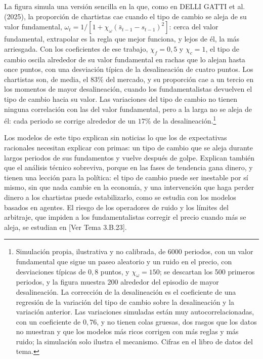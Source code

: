 \documentclass[10pt,a4paper]{article}
\newcommand{\authorfont}[1]{{\fontfamily{EBGaramond-TLF}\selectfont #1}}
\begin{document}
La figura simula una versión sencilla en la que, como en DELLI GATTI et al. (2025), la proporción de chartistas cae cuando el tipo de cambio se aleja de su valor fundamental, $\omega_t=1/[1+\chi_\omega(\bar s_{t-1}-s_{t-1})^2]$: cerca del valor fundamental, extrapolar es la regla que mejor funciona, y lejos de él, la más arriesgada. Con los coeficientes de ese trabajo, $\chi_f=0{,}5$ y $\chi_c=1$, el tipo de cambio oscila alrededor de su valor fundamental en rachas que lo alejan hasta once puntos, con una desviación típica de la desalineación de cuatro puntos. Los chartistas son, de media, el $83\%$ del mercado, y su proporción cae a un tercio en los momentos de mayor desalineación, cuando los fundamentalistas devuelven el tipo de cambio hacia su valor. Las variaciones del tipo de cambio no tienen ninguna correlación con las del valor fundamental, pero a la larga no se aleja de él: cada periodo se corrige alrededor de un $17\%$ de la desalineación.\footnote{%
    Simulación propia, ilustrativa y no calibrada, de 6000 periodos, con un valor fundamental que sigue un paseo aleatorio y un ruido en el precio, con desviaciones típicas de $0{,}8$ puntos, y $\chi_\omega=150$; se descartan los 500 primeros periodos, y la figura muestra 200 alrededor del episodio de mayor desalineación. La corrección de la desalineación es el coeficiente de una regresión de la variación del tipo de cambio sobre la desalineación y la variación anterior. Las variaciones simuladas están muy autocorrelacionadas, con un coeficiente de $0{,}76$, y no tienen colas gruesas, dos rasgos que los datos no muestran y que los modelos más ricos corrigen con más reglas y más ruido; la simulación solo ilustra el mecanismo. Cifras en el libro de datos del tema.
}

Los modelos de este tipo explican sin noticias lo que los de expectativas racionales necesitan explicar con primas: un tipo de cambio que se aleja durante largos periodos de sus fundamentos y vuelve después de golpe. Explican también que el análisis técnico sobreviva, porque en las fases de tendencia gana dinero, y tienen una lección para la política: el tipo de cambio puede ser inestable por sí mismo, sin que nada cambie en la economía, y una intervención que haga perder dinero a los chartistas puede estabilizarlo, como se estudia con los modelos basados en agentes. El riesgo de los operadores de ruido y los límites del arbitraje, que impiden a los fundamentalistas corregir el precio cuando más se aleja, se estudian en [\authorfont{Ver Tema 3.B.23}].
\end{document}
